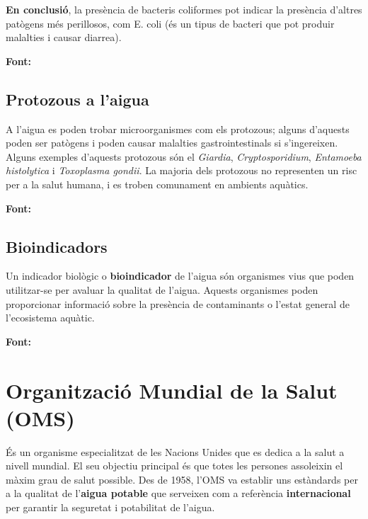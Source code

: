 \textbf{En conclusió}, la presència de bacteris coliformes pot indicar la presència d'altres patògens més perillosos, com E. coli (és un tipus de bacteri que pot produir malalties i causar diarrea).

\textbf{Font:} \cite{UCM}

\subsection{Protozous a l’aigua} \label{subsec:protozous}
A l’aigua es poden trobar microorganismes com els protozous; alguns d’aquests poden ser patògens i poden causar malalties gastrointestinals si s’ingereixen. Alguns exemples d’aquests protozous són el \textit{Giardia}, \textit{Cryptosporidium}, \textit{Entamoeba histolytica} i \textit{Toxoplasma gondii}. La majoria dels protozous no representen un risc per a la salut humana, i es troben comunament en ambients aquàtics.

\textbf{Font:} \cite{HA}

\subsection{Bioindicadors} \label{subsec:indicadorbiologic}
Un indicador biològic o \textbf{bioindicador} de l’aigua són organismes vius que poden utilitzar-se per avaluar la qualitat de l’aigua. Aquests organismes poden proporcionar informació sobre la presència de contaminants o l’estat general de l’ecosistema aquàtic.

\textbf{Font:} \cite{HA}




\section{Organització Mundial de la Salut (OMS)}
És un organisme especialitzat de les Nacions Unides que es dedica a la salut a nivell mundial. El seu objectiu principal és que totes les persones assoleixin el màxim grau de salut possible.
Des de 1958, l'OMS va establir uns estàndards per a la qualitat de l’\textbf{aigua potable} que serveixen com a referència \textbf{internacional} per garantir la seguretat i potabilitat de l’aigua.
